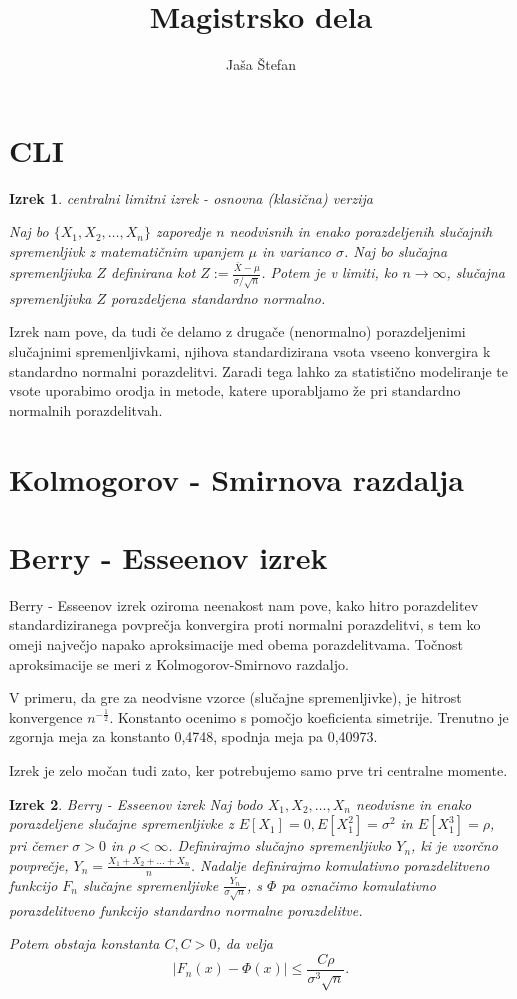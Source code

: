 \documentclass[12pt]{article}
\title{Magistrsko dela}
\author{Jaša Štefan}
\newtheorem{theorem}{Izrek}
\begin{document}
\maketitle

\section{CLI}
\begin{theorem}{centralni limitni izrek - osnovna (klasična) verzija}

Naj bo $\{X_1, X_2, \dots, X_n\}$ zaporedje $n$ neodvisnih in enako porazdeljenih slučajnih spremenljivk z matematičnim upanjem $\mu$ in varianco $\sigma$. Naj bo slučajna spremenljivka $Z$ definirana kot $Z := \frac{\bar{X} - \mu}{\sigma / \sqrt{n}}$.  Potem je v limiti, ko $n \rightarrow \infty$, slučajna spremenljivka $Z$ porazdeljena standardno normalno.
\end{theorem}

Izrek nam pove, da tudi če delamo z drugače (nenormalno) porazdeljenimi slučajnimi spremenljivkami, njihova standardizirana vsota vseeno konvergira k standardno normalni porazdelitvi. Zaradi tega lahko za statistično modeliranje te vsote uporabimo orodja in metode, katere uporabljamo že pri standardno normalnih porazdelitvah. 


\section{Kolmogorov - Smirnova razdalja}




\section{Berry - Esseenov izrek}
Berry - Esseenov izrek oziroma neenakost nam pove, kako hitro porazdelitev standardiziranega povprečja konvergira proti normalni porazdelitvi, s tem ko omeji največjo napako aproksimacije med obema porazdelitvama. Točnost aproksimacije se meri z Kolmogorov-Smirnovo razdaljo. 

V primeru, da gre za neodvisne vzorce (slučajne spremenljivke), je hitrost konvergence $n^{-\frac{1}{2}}$. Konstanto ocenimo s pomočjo koeficienta simetrije. Trenutno je zgornja meja za konstanto 0,4748, spodnja meja pa 0,40973.

Izrek je zelo močan tudi zato, ker potrebujemo samo prve tri centralne momente.

\begin{theorem}{Berry - Esseenov izrek}
Naj bodo $X_1, X_2, \dots ,X_n$ neodvisne in enako porazdeljene slučajne spremenljivke z $E[X_1] = 0, E[X_1^2] = \sigma^2$ in $E[X_1^3] = \rho$, pri čemer $\sigma > 0$ in $\rho < \infty$.  Definirajmo slučajno spremenljivko $Y_n$, ki je vzorčno povprečje, $Y_n = \frac{X_1 + X_2+ \dots +X_n}{n}$. 
Nadalje definirajmo komulativno porazdelitveno funkcijo $F_n$ slučajne spremenljivke $\frac{Y_n}{\sigma\sqrt{n}}$, s $\Phi$ pa označimo komulativno porazdelitveno funkcijo standardno normalne porazdelitve. 

Potem obstaja konstanta $C, C>0$, da velja 
$$ |F_n(x) - \Phi(x)| \leq \frac{C \rho}{\sigma^3\sqrt{n}}.$$
\end{theorem}
\end{document}
